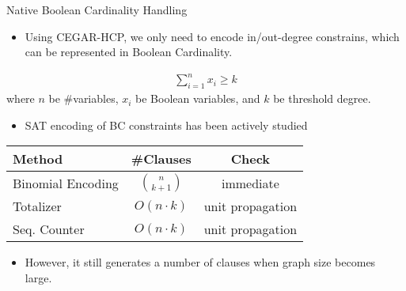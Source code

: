 \documentclass{beamer}
\begin{document}
\begin{frame}{Native Boolean Cardinality Handling}
  \begin{itemize}
  \item Using CEGAR-HCP, we only need to encode in/out-degree constrains, which can be represented in Boolean Cardinality.
\end{itemize}
  \begin{block}{}
\centering
\begin{align*}
\sum_{i=1}^{n}x_{i} \ge k
\end{align*}
where $n$ be \#variables, $x_{i}$ be Boolean variables, and $k$ be threshold degree.
  \end{block}
\begin{itemize}
  \item SAT encoding of BC constraints has been actively studied
  \end{itemize}
\begin{center}
\begin{tabular}{lcc}
\hline
Method & \#Clauses & Check \\\hline
 Binomial Encoding & $\binom{n}{k+1}$ & immediate\\
Totalizer~\cite{DBLP:journals/jsat/BailleuxBR06} & $O(n\cdot{k})$ & unit propagation\\
Seq. Counter~\cite{DBLP:conf/cp/Sinz05} & $O(n\cdot{k})$ & unit propagation\\
\hline
\end{tabular}
\end{center}

\begin{itemize}
  \item However, it still generates a number of clauses when graph size becomes large.
  \end{itemize}
\end{frame}
\end{document}
